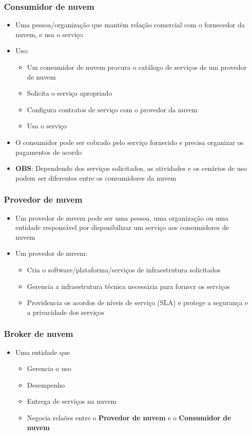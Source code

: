 \begin{frame}
	\frametitle{Consumidor de nuvem}
	\begin{itemize}
		\item Uma pessoa/organização que mantém relação comercial com o fornecedor da nuvem, e usa o serviço
		\item Uso:
			\begin{itemize}
				\item Um consumidor de nuvem procura o catálogo de serviços de um provedor de nuvem
				\item Solicita o serviço apropriado
				\item Configura contratos de serviço com o provedor da nuvem
				\item Usa o serviço
			\end{itemize}
		\item O consumidor pode ser cobrado pelo serviço fornecido e precisa organizar os pagamentos de acordo
		\item \textbf{OBS}: Dependendo dos serviços solicitados, as atividades e os cenários de uso podem ser diferentes entre os consumidores da nuvem
	\end{itemize}
\end{frame}

\begin{frame}
	\frametitle{Provedor de nuvem}
	\begin{itemize}
		\item Um provedor de nuvem pode ser uma pessoa, uma organização ou uma entidade responsável por disponibilizar um serviço aos consumidores de nuvem
		\item Um provedor de nuvem:
			\begin{itemize}
				\item Cria o software/plataforma/serviços de infraestrutura solicitados
				\item Gerencia a infraestrutura técnica necessária para fornecr os serviços
				\item Providencia os acordos de níveis de serviço (SLA) e protege a segurança e a privacidade dos serviços
			\end{itemize}
	\end{itemize}
\end{frame}

\begin{frame}
	\frametitle{Broker de nuvem}
	\begin{itemize}
		\item Uma entidade que
			\begin{itemize}
				\item Gerencia o uso
				\item Desempenho
				\item Entrega de serviços na nuvem
				\item Negocia relaões entre o \textbf{Provedor de nuvem} e o \textbf{Consumidor de nuvem}
			\end{itemize}
	\end{itemize}
\end{frame}

